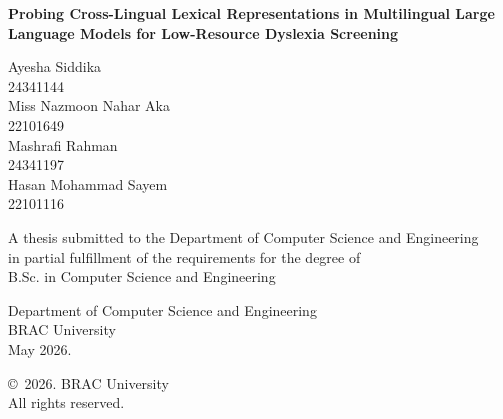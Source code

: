 \begin{titlepage}
\renewcommand*{\thepage}{Title}

    \begin{center}
        \vspace*{2cm}

        {\fontsize{18pt}{24pt}\selectfont\textbf{Probing Cross-Lingual Lexical Representations in Multilingual Large Language Models for Low-Resource Dyslexia Screening}}

        \vspace{1.5cm}


        \vspace{0.5cm}

            Ayesha Siddika\\
            24341144\\
            Miss Nazmoon Nahar Aka\\
            22101649\\
            Mashrafi Rahman\\
            24341197\\
            Hasan Mohammad Sayem\\
            22101116

        \vspace{1.5cm}

            A thesis submitted to the Department of Computer Science and Engineering\\
            in partial fulfillment of the requirements for the degree of\\
            B.Sc. in Computer Science and Engineering

        \vspace{2.5cm}

            Department of Computer Science and Engineering\\
            BRAC University\\
            May 2026.

        \vspace{3cm}

            \copyright\ 2026. BRAC University\\
            All rights reserved.

    \end{center}

\end{titlepage}
